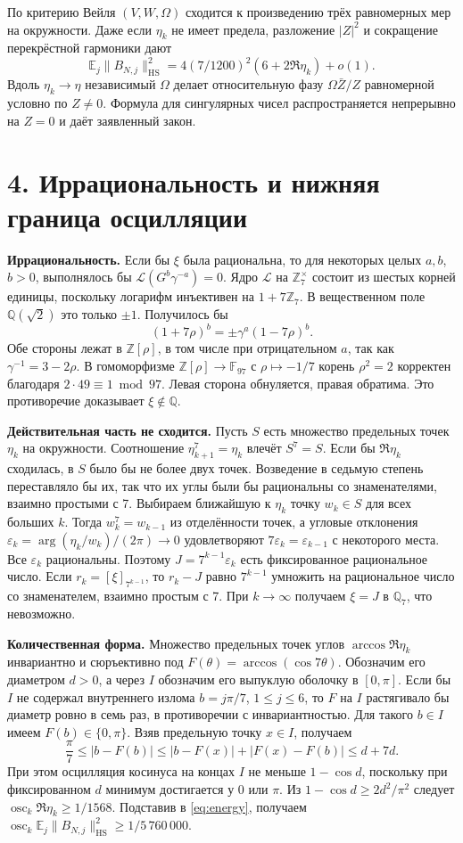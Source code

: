 \documentclass[11pt,a4paper]{article}
\newcommand{\EE}{\mathbb E}
\newcommand{\Z}{\mathbb Z}
\newcommand{\sect}[1]{\section*{\sffamily\color{ink}#1}}
\newcommand{\subt}[1]{\par\medskip\noindent\textbf{#1.}\quad}
\newcommand{\Zp}{\mathbb Z_7}
\newcommand{\Qp}{\mathbb Q_7}
\newcommand{\Q}{\mathbb Q}
\newcommand{\HS}{\mathrm{HS}}
\begin{document}
По критерию Вейля \((V,W,\Omega)\) сходится к произведению трёх равномерных мер на окружности. Даже если \(\eta_k\) не имеет предела, разложение \(|Z|^2\) и сокращение перекрёстной гармоники дают
\begin{equation}
   \EE_j\|B_{N,j}\|^2_{\HS}
        =4(7/1200)^2(6+2\Re\eta_k)+o(1). \label{eq:energy}
\end{equation}
Вдоль \(\eta_k\to\eta\) независимый \(\Omega\) делает относительную фазу \(\Omega\bar Z/Z\) равномерной условно по \(Z\ne0\). Формула для сингулярных чисел распространяется непрерывно на \(Z=0\) и даёт заявленный закон.

\newpage
\sect{4. Иррациональность и нижняя граница осцилляции}
\subt{Иррациональность}
Если бы \(\xi\) была рациональна, то для некоторых целых \(a,b\), \(b>0\), выполнялось бы \(\mathcal L(G^b\gamma^{-a})=0\). Ядро \(\mathcal L\) на \(\Zp^\times\) состоит из шестых корней единицы, поскольку логарифм инъективен на \(1+7\Zp\). В вещественном поле \(\Q(\sqrt2)\) это только \(\pm1\). Получилось бы
\[
            (1+7\rho)^b= \pm\gamma^a(1-7\rho)^b.
\]
Обе стороны лежат в \(\Z[\rho]\), в том числе при отрицательном \(a\), так как \(\gamma^{-1}=3-2\rho\). В гомоморфизме \(\Z[\rho]\to\mathbb F_{97}\) с \(\rho\mapsto-1/7\) корень \(\rho^2=2\) корректен благодаря \(2\cdot49\equiv1\bmod97\). Левая сторона обнуляется, правая обратима. Это противоречие доказывает \(\xi\notin\Q\).

\subt{Действительная часть не сходится}
Пусть \(S\) есть множество предельных точек \(\eta_k\) на окружности. Соотношение \(\eta_{k+1}^7=\eta_k\) влечёт \(S^7=S\). Если бы \(\Re\eta_k\) сходилась, в \(S\) было бы не более двух точек. Возведение в седьмую степень переставляло бы их, так что их углы были бы рациональны со знаменателями, взаимно простыми с 7. Выбираем ближайшую к \(\eta_k\) точку \(w_k\in S\) для всех больших \(k\). Тогда \(w_k^7=w_{k-1}\) из отделённости точек, а угловые отклонения \(\varepsilon_k=\arg(\eta_k/w_k)/(2\pi)\to0\) удовлетворяют \(7\varepsilon_k=\varepsilon_{k-1}\) с некоторого места. Все \(\varepsilon_k\) рациональны. Поэтому \(J=7^{k-1}\varepsilon_k\) есть фиксированное рациональное число. Если \(r_k=[\xi]_{7^{k-1}}\), то \(r_k-J\) равно \(7^{k-1}\) умножить на рациональное число со знаменателем, взаимно простым с 7. При \(k\to\infty\) получаем \(\xi=J\) в \(\Qp\), что невозможно.

\subt{Количественная форма}
Множество предельных точек углов \(\arccos\Re\eta_k\) инвариантно и сюръективно под \(F(\theta)=\arccos(\cos 7\theta)\). Обозначим его диаметром \(d>0\), а через \(I\) обозначим его выпуклую оболочку в \([0,\pi]\). Если бы \(I\) не содержал внутреннего излома \(b=j\pi/7\), \(1\le j\le6\), то \(F\) на \(I\) растягивало бы диаметр ровно в семь раз, в противоречии с инвариантностью. Для такого \(b\in I\) имеем \(F(b)\in\{0,\pi\}\). Взяв предельную точку \(x\in I\), получаем
\[
  \frac{\pi}{7}\le |b-F(b)|\le |b-F(x)|+|F(x)-F(b)|\le d+7d .
\]
При этом осцилляция косинуса на концах \(I\) не меньше \(1-\cos d\), поскольку при фиксированном \(d\) минимум достигается у \(0\) или \(\pi\). Из \(1-\cos d\ge2d^2/\pi^2\) следует \(\operatorname{osc}_k\Re\eta_k\ge1/1568\). Подставив в \eqref{eq:energy}, получаем \(\operatorname{osc}_k\EE_j\|B_{N,j}\|^2_{\HS}\ge 1/5\,760\,000\).
\end{document}
